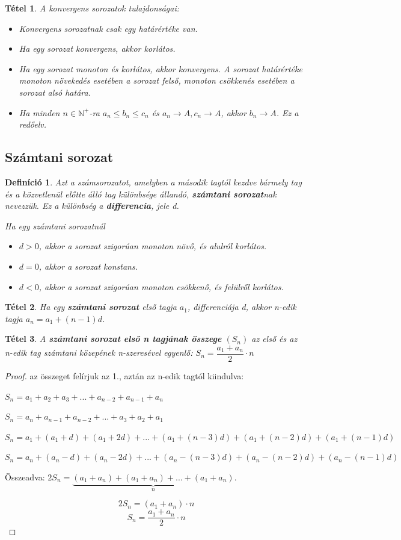 \documentclass[12pt,a4paper]{article}
\newtheorem{theorem}{Tétel} [section]
\newtheorem{definition}{Definíció} [section]
\begin{document}
\begin{theorem}
A konvergens sorozatok tulajdonságai:
\begin{itemize}
\item Konvergens sorozatnak csak egy határértéke van.
\item Ha egy sorozat konvergens, akkor korlátos.
\item Ha egy sorozat monoton és korlátos, akkor konvergens. A sorozat határértéke monoton növekedés esetében a sorozat felső, monoton csökkenés esetében a sorozat alsó határa.
\item Ha minden $n\in \mathbb{N}^+$-ra $a_n\leq b_n \leq c_n$ és $a_n\to A, c_n\to A$, akkor $b_n\to A$. Ez a redőelv.
\end{itemize}
\end{theorem}

\subsection{Számtani sorozat}
\begin{definition}
Azt a számsorozatot, amelyben a második tagtól kezdve bármely tag és a közvetlenül előtte álló tag különbsége állandó, \textbf{számtani sorozat}nak nevezzük. Ez a különbség a \textbf{differencia}, jele d.

Ha egy számtani sorozatnál
\begin{itemize}
\item $d > 0$, akkor a sorozat szigorúan monoton növő, és alulról korlátos.
\item $d = 0$, akkor a sorozat konstans.
\item $d < 0$, akkor a sorozat szigorúan monoton csökkenő, és felülről korlátos.
\end{itemize}
\end{definition}

\begin{theorem}
 Ha egy \textbf{számtani sorozat} első tagja $a_1$, differenciája d, akkor n-edik tagja $a_n = a_1 + (n - 1)d$.
\end{theorem}

\begin{theorem}
A \textbf{számtani sorozat első n tagjának összege} $(S_n)$ az első és az n-edik tag számtani közepének n-szeresével egyenlő: $S_n=\dfrac{a_1+a_n}{2}\cdot n$
\end{theorem}
\begin{proof}
az összeget felírjuk az 1., aztán az n-edik tagtól kiindulva:

$S_n=a_1+a_2+a_3+...+a_{n-2}+a_{n-1}+a_n$

$S_n=a_n+a_{n-1}+a_{n-2}+...+a_3+a_2+a_1$

$S_n=a_1+(a_1+d)+(a_1+2d)+...+(a_1+(n-3)d)+(a_1+(n-2)d)+(a_1+(n-1)d)$

$S_n=a_n+(a_n-d)+(a_n-2d)+...+(a_n-(n-3)d)+(a_n-(n-2)d)+(a_n-(n-1)d)$

Összeadva:
$2S_n=\underbrace{(a_1+a_n)+(a_1+a_n)+...+(a_1+a_n)}_{n}$.

$$2S_n=(a_1+a_n)\cdot n$$
$$S_n=\dfrac{a_1+a_n}{2}\cdot n$$
\end{proof}
\end{document}
